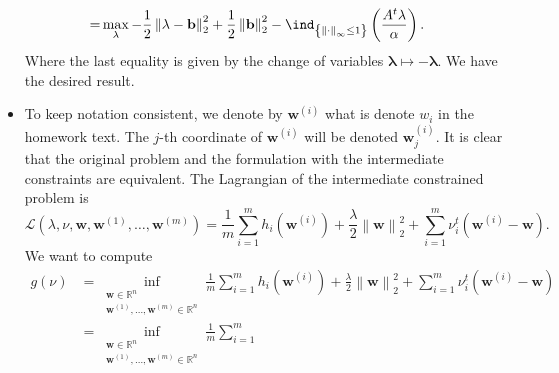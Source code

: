 \documentclass{article}
\begin{document}
\begin{itemize}
\begin{align*}
               =& \max_{\mathbf{\lambda}} -\frac{1}{2}\left\|\mathbf{\lambda}-\mathbf{b}\right\|_{2}^{2}
               +\frac{1}{2}\left\|\mathbf{b}\right\|_{2}^{2}
               -\ind_{\left\{\left\|\cdot\right\|_{\infty} \leq 1\right\}}
               \left(\frac{A^{t}\mathbf{\lambda}}{\alpha}\right).
           \end{align*}
           Where the last equality is given
           by the change of variables
           $\mathbf{\lambda} \mapsto - \mathbf{\lambda}$.
           We have the desired result.
       \item To keep notation consistent, we denote
           by $\mathbf{w}^{\left(i\right)}$ what is
           denote $w_{i}$ in
           the homework text. The
           $j$-th coordinate of $\mathbf{w}^{\left(i\right)}$ 
           will be denoted $\mathbf{w}^{\left(i\right)}_{j}$.
           It is clear that the original problem and
           the formulation with
           the intermediate 
           constraints are equivalent.
           The Lagrangian of the
           intermediate
           constrained problem is
           \begin{equation*}
               \mathcal{L}\left(\lambda, \nu, \mathbf{w}, \mathbf{w}^{\left(1\right)}, 
               \ldots, \mathbf{w}^{\left(m\right)}\right) =
               \frac{1}{m} \sum_{i = 1}^{m} h_{i}\left(\mathbf{w}^{\left(i\right)}\right)
               + \frac{\lambda}{2} \left\|\mathbf{w}\right\|^{2}_{2}
               + \sum_{i = 1}^{m}\nu_{i}^{t}\left(\mathbf{w}^{\left(i\right)} - \mathbf{w}\right).
           \end{equation*}
           We want to compute
           \begin{align*}
               g\left(\nu\right) &=
               \inf_{\substack{
               \mathbf{w} \in \mathbb{R}^{n} \\
               \mathbf{w}^{\left(1\right)}, \ldots, \mathbf{w}^{\left(m\right)} \in \mathbb{R}^{n}      
               }}
               \frac{1}{m} \sum_{i = 1}^{m} h_{i}\left(\mathbf{w}^{\left(i\right)}\right)
               + \frac{\lambda}{2} \left\|\mathbf{w}\right\|^{2}_{2}
               + \sum_{i = 1}^{m} \nu_{i}^{t} \left(\mathbf{w}^{\left(i\right)} - \mathbf{w}\right) \\
               &= \inf_{\substack{
               \mathbf{w} \in \mathbb{R}^{n} \\
               \mathbf{w}^{\left(1\right)}, \ldots, \mathbf{w}^{\left(m\right)} \in \mathbb{R}^{n}      
               }}
               \frac{1}{m} \sum_{i = 1}^{m}

\end{align*}
\end{itemize}
\end{document}
